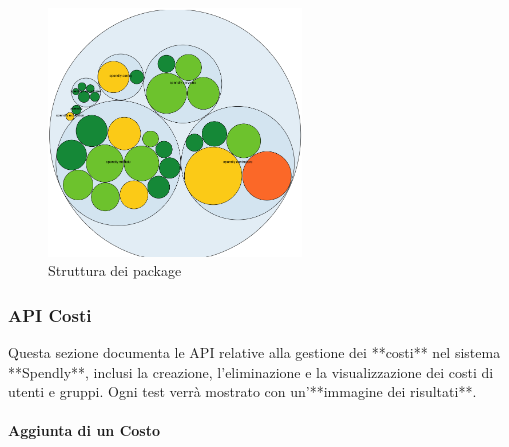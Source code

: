 \begin{figure}[H]
    \centering
    \includegraphics[width=0.6\textwidth]{images/Package_iter2.png}
    \caption{Struttura dei package}
    \label{fig:Package_iterazione2}
\end{figure}

\subsubsection{API Costi}

Questa sezione documenta le API relative alla gestione dei **costi** nel sistema **Spendly**, inclusi la creazione, l'eliminazione e la visualizzazione dei costi di utenti e gruppi. Ogni test verrà mostrato con un'**immagine dei risultati**.

\paragraph{Aggiunta di un Costo}  

